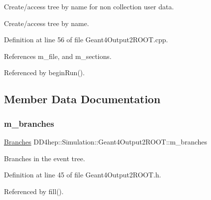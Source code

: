Create/access tree by name for non collection user data. 

Create/access tree by name. 

Definition at line 56 of file Geant4\+Output2\+R\+O\+O\+T.\+cpp.



References m\+\_\+file, and m\+\_\+sections.



Referenced by begin\+Run().



\subsection{Member Data Documentation}
\hypertarget{class_d_d4hep_1_1_simulation_1_1_geant4_output2_r_o_o_t_aaa47a8c6bcede196e832490b3a7c90bd}{}\label{class_d_d4hep_1_1_simulation_1_1_geant4_output2_r_o_o_t_aaa47a8c6bcede196e832490b3a7c90bd} 
\subsubsection{\texorpdfstring{m\+\_\+branches}{m\_branches}}
{\footnotesize\ttfamily \hyperlink{class_d_d4hep_1_1_simulation_1_1_geant4_output2_r_o_o_t_a7c5890a17d3f70ce65703cdbec3cf53c}{Branches} D\+D4hep\+::\+Simulation\+::\+Geant4\+Output2\+R\+O\+O\+T\+::m\+\_\+branches\hspace{0.3cm}{\ttfamily [protected]}}



Branches in the event tree. 



Definition at line 45 of file Geant4\+Output2\+R\+O\+O\+T.\+h.



Referenced by fill().

\hypertarget{class_d_d4hep_1_1_simulation_1_1_geant4_output2_r_o_o_t_aaaa94e6e9906bc1853e149bc82cfb2af}{}\label{class_d_d4hep_1_1_simulation_1_1_geant4_output2_r_o_o_t_aaaa94e6e9906bc1853e149bc82cfb2af} 
